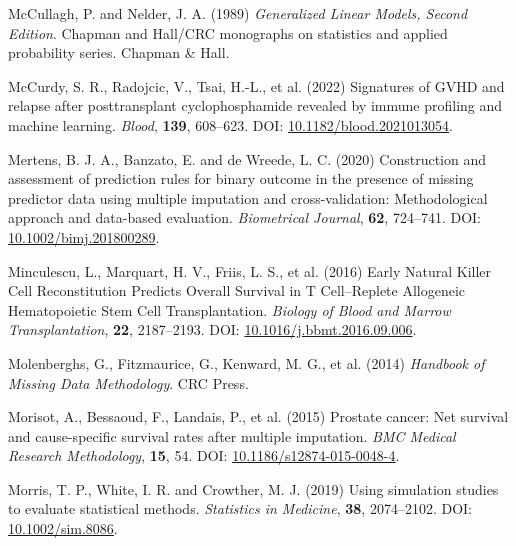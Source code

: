 \documentclass[
  letterpaper,
  DIV=11,
  numbers=noendperiod]{scrreprt}
\newlength{\cslhangindent}
\newlength{\cslentryspacingunit} %
\newenvironment{CSLReferences}[2] %
 {%
  \setlength{\parindent}{0pt}
  \ifodd #1
  \let\oldpar\par
  \def\par{\hangindent=\cslhangindent\oldpar}
  \fi
  \setlength{\parskip}{#2\cslentryspacingunit}
 }%
 {}
\begin{document}
\begin{CSLReferences}{1}{0}
\leavevmode{}%
McCullagh, P. and Nelder, J. A. (1989) \emph{Generalized Linear Models,
Second Edition}. Chapman and {Hall}/{CRC} monographs on statistics and
applied probability series. Chapman \& Hall.

\leavevmode{}%
McCurdy, S. R., Radojcic, V., Tsai, H.-L., et al. (2022) Signatures of
{GVHD} and relapse after posttransplant cyclophosphamide revealed by
immune profiling and machine learning. \emph{Blood}, \textbf{139},
608--623. DOI:
\href{https://doi.org/10.1182/blood.2021013054}{10.1182/blood.2021013054}.

\leavevmode{}%
Mertens, B. J. A., Banzato, E. and de Wreede, L. C. (2020) Construction
and assessment of prediction rules for binary outcome in the presence of
missing predictor data using multiple imputation and cross-validation:
{Methodological} approach and data-based evaluation. \emph{Biometrical
Journal}, \textbf{62}, 724--741. DOI:
\href{https://doi.org/10.1002/bimj.201800289}{10.1002/bimj.201800289}.

\leavevmode{}%
Minculescu, L., Marquart, H. V., Friis, L. S., et al. (2016) Early
{Natural Killer Cell Reconstitution Predicts Overall Survival} in {T
Cell}--{Replete Allogeneic Hematopoietic Stem Cell Transplantation}.
\emph{Biology of Blood and Marrow Transplantation}, \textbf{22},
2187--2193. DOI:
\href{https://doi.org/10.1016/j.bbmt.2016.09.006}{10.1016/j.bbmt.2016.09.006}.

\leavevmode{}%
Molenberghs, G., Fitzmaurice, G., Kenward, M. G., et al. (2014)
\emph{Handbook of {Missing Data Methodology}}. CRC Press.

\leavevmode{}%
Morisot, A., Bessaoud, F., Landais, P., et al. (2015) Prostate cancer:
Net survival and cause-specific survival rates after multiple
imputation. \emph{BMC Medical Research Methodology}, \textbf{15}, 54.
DOI:
\href{https://doi.org/10.1186/s12874-015-0048-4}{10.1186/s12874-015-0048-4}.

\leavevmode{}%
Morris, T. P., White, I. R. and Crowther, M. J. (2019) Using simulation
studies to evaluate statistical methods. \emph{Statistics in Medicine},
\textbf{38}, 2074--2102. DOI:
\href{https://doi.org/10.1002/sim.8086}{10.1002/sim.8086}.


\end{CSLReferences}
\end{document}
